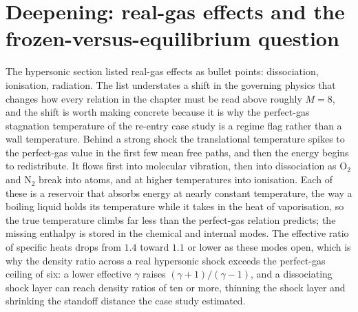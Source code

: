 \section{Deepening: real-gas effects and the frozen-versus-equilibrium
question}

The hypersonic section listed real-gas effects as bullet points:
dissociation, ionisation, radiation. The list understates a shift in the
governing physics that changes how every relation in the chapter must be
read above roughly $M = 8$, and the shift is worth making concrete
because it is why the perfect-gas stagnation temperature of the re-entry
case study is a regime flag rather than a wall temperature. Behind a
strong shock the translational temperature spikes to the perfect-gas
value in the first few mean free paths, and then the energy begins to
redistribute. It flows first into molecular vibration, then into
dissociation as $\mathrm{O}_2$ and $\mathrm{N}_2$ break into atoms, and
at higher temperatures into ionisation. Each of these is a reservoir that
absorbs energy at nearly constant temperature, the way a boiling liquid
holds its temperature while it takes in the heat of vaporisation, so the
true temperature climbs far less than the perfect-gas relation predicts;
the missing enthalpy is stored in the chemical and internal modes. The
effective ratio of specific heats drops from $1.4$ toward $1.1$ or lower
as these modes open, which is why the density ratio across a real
hypersonic shock exceeds the perfect-gas ceiling of six: a lower
effective $\gamma$ raises $(\gamma + 1)/(\gamma - 1)$, and a dissociating
shock layer can reach density ratios of ten or more, thinning the shock
layer and shrinking the standoff distance the case study estimated.

